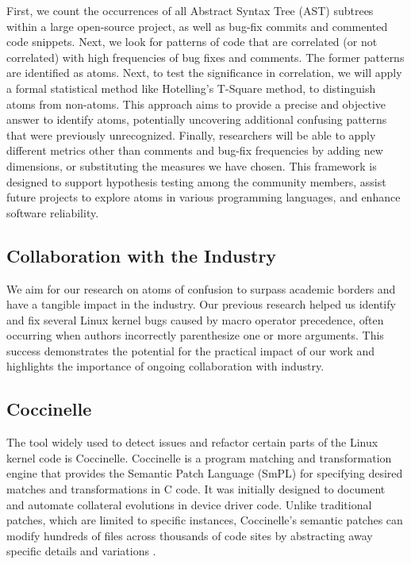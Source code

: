 \documentclass[conference]{IEEEtran}
\begin{document}
First, we count the 
occurrences of all Abstract Syntax Tree (AST) subtrees within a large open-source 
project, as well as bug-fix commits and commented code 
snippets. Next, we look for patterns of code that are correlated (or not correlated) with high frequencies of 
bug fixes and comments. The former patterns are identified as atoms. Next, to test the significance in correlation, we will apply a formal statistical method like Hotelling’s T-Square method, to distinguish atoms from non-atoms. This approach aims 
to provide a precise and objective answer to identify atoms, potentially uncovering additional 
confusing patterns that were previously unrecognized. 
Finally, researchers will be able to apply different 
metrics other than comments and bug-fix frequencies by adding new dimensions, or substituting the measures we have chosen.
This framework is  
designed to support hypothesis testing among the community 
members, assist future projects to 
explore atoms in various programming languages, and enhance software reliability. 


\subsection{Collaboration with the Industry}

We aim for our research on atoms of confusion to surpass 
academic borders and have a tangible impact in the industry. 
Our previous research helped us identify and fix several Linux kernel bugs caused by macro operator precedence, often occurring when authors incorrectly parenthesize one or more arguments. This success demonstrates 
the potential for the practical impact of our work and 
highlights the importance of ongoing collaboration with 
industry.

\subsection{Coccinelle}

The tool widely used to detect issues and refactor certain 
parts of the Linux kernel code is Coccinelle. Coccinelle is a 
program matching and transformation engine that provides the 
Semantic Patch Language (SmPL) for specifying desired matches 
and transformations in C code. It was initially designed to 
document and automate collateral evolutions in device driver 
code. Unlike traditional patches, which are limited to 
specific instances, Coccinelle's semantic patches can modify 
hundreds of files across thousands of code sites by 
abstracting away specific details and variations \cite{coccinelle}.
\end{document}
